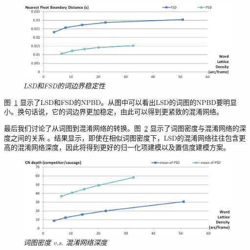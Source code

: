       \begin{figure}[tbhp!]
        \centering
        \includegraphics[width=\linewidth]{figure/bound-stable.png}
        \caption{{\it LSD和FSD的词边界稳定性}}
        \label{fig:bound-stable}
      \end{figure}
图~\ref{fig:bound-stable} 显示了LSD和FSD的NPBD。从图中可以看出LSD的词图的NPBD要明显小。换句话说，它的词边界更加稳定，由此可以得到更紧致的混淆网络。

最后我们讨论了从词图到混淆网络的转换。图~\ref{fig:latden-cndepth} 显示了词图密度与混淆网络的深度之间的关系 \cite{hakkani2006beyond}。结果显示，即使在相似词图密度下，LSD的混淆网络往往包含更高的混淆网络深度，因此将得到更好的归一化项建模以及置信度建模方案。 

      \begin{figure}[tbhp!]
        \centering
        \includegraphics[width=\linewidth]{figure/latden-cndepth.png}

        \caption{{\it 词图密度 v.s. 混淆网络深度 }}
        \label{fig:latden-cndepth}

      \end{figure}





